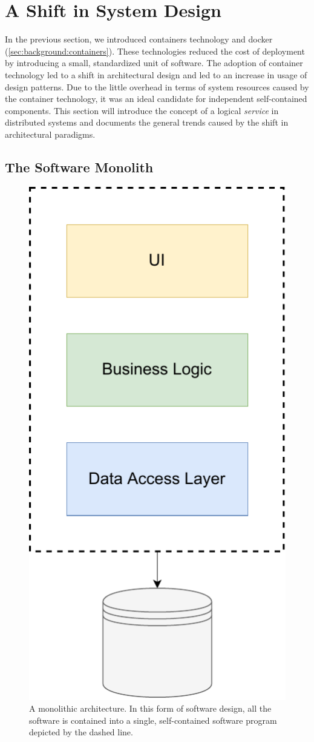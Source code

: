 \section{A Shift in System Design}
\label{sec:background:soa}

In the previous section, we introduced \glspl{container} technology and \Gls{docker} (\cref{sec:background:containers}). These technologies reduced the cost of deployment by introducing a small, standardized unit of software. The adoption of container technology led to a shift in architectural design and led to an increase in usage of  design patterns. Due to the little overhead in terms of system resources caused by the \gls{container} technology, it was an ideal candidate for independent self-contained components. This section will introduce the concept of a logical \textit{service} in distributed systems and documents the general trends caused by the shift in architectural paradigms.

\subsection{The Software Monolith}
\label{sec:background:soa:monolith}

\begin{figure}[!t]
    \centering
    
    \includegraphics[width=0.3\linewidth]{2_background/figures/monolith-architecture.pdf}

    \caption[A monolithic software architecture]{A monolithic architecture. In this form of software design, all the software is contained into a single, self-contained software program depicted by the dashed line. }
    \label{fig:monolithic-architecture}
\end{figure}


